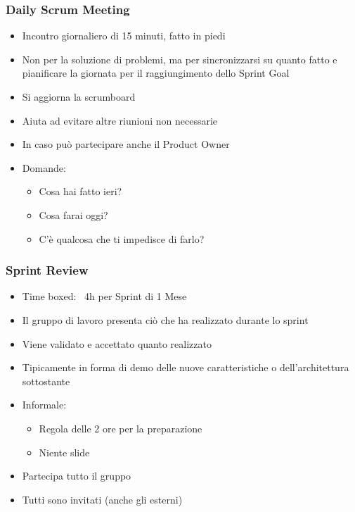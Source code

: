 \subsubsection{Daily Scrum Meeting}
\begin{itemize}
    \item Incontro giornaliero di 15 minuti, fatto in piedi
    \item Non per la soluzione di problemi, ma per sincronizzarsi su quanto fatto e pianificare la giornata per il raggiungimento dello Sprint Goal
    \item Si aggiorna la scrumboard
    \item Aiuta ad evitare altre riunioni non necessarie
    \item In caso può partecipare anche il Product Owner
    \item Domande:
    \begin{itemize}
        \item Cosa hai fatto ieri?
        \item Cosa farai oggi?
        \item C’è qualcosa che ti impedisce di farlo?
    \end{itemize}
\end{itemize}

\subsubsection{Sprint Review}
\begin{itemize}
    \item Time boxed: ~4h per Sprint di 1 Mese
    \item Il gruppo di lavoro presenta ciò che ha realizzato durante lo sprint
    \item Viene validato e accettato quanto realizzato
    \item Tipicamente in forma di demo delle nuove caratteristiche o dell’architettura sottostante
    \item Informale:
    \begin{itemize}
        \item Regola delle 2 ore per la preparazione
        \item Niente slide
    \end{itemize}
    \item Partecipa tutto il gruppo
    \item Tutti sono invitati (anche gli esterni)
\end{itemize}

